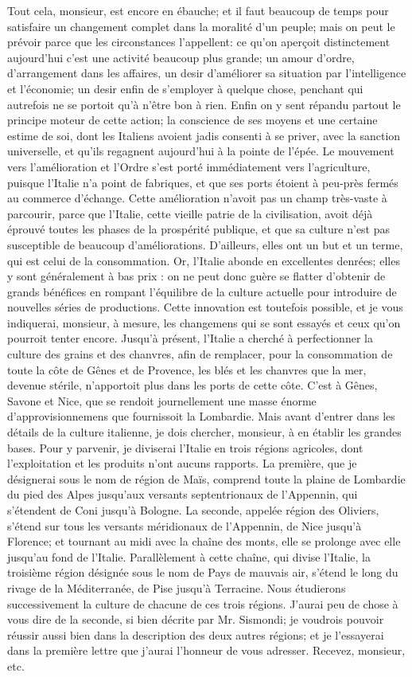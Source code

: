 Tout\setcounter{page}{369} cela, monsieur, est encore en ébauche; et il faut beaucoup de temps pour satisfaire un changement complet dans la moralité d'un peuple; mais on peut le prévoir parce que les circonstances l'appellent: ce qu'on aperçoit distinctement aujourd'hui c'est une activité beaucoup plus grande; un amour d'ordre, d'arrangement dans les affaires, un desir d'améliorer sa situation par l'intelligence et l'économie; un desir enfin de s'employer à quelque chose, penchant qui autrefois ne se portoit qu'à n'être bon à rien. Enfin on y sent répandu partout le principe moteur de cette action; la conscience de ses moyens et une certaine estime de soi, dont les Italiens avoient jadis consenti à se priver, avec la sanction universelle, et qu'ils regagnent aujourd'hui à la pointe de l'épée.
Le mouvement vers l'amélioration et l'Ordre s'est porté immédiatement vers l'agriculture, puisque l'Italie n'a point de fabriques, et que ses ports étoient à peu-près fermés au commerce d'échange. Cette amélioration n'avoit pas un champ très-vaste à parcourir, parce que l'Italie, cette vieille patrie de la civilisation, avoit déjà éprouvé toutes les phases de la prospérité publique, et que sa culture n'est pas susceptible de beaucoup\setcounter{page}{370} d’améliorations. D’ailleurs, elles ont un but et un terme, qui est celui de la consommation. Or, l’Italie abonde en excellentes denrées; elles y sont généralement à bas prix : on ne peut donc guère se flatter d’obtenir de grands bénéfices en rompant l’équilibre de la culture actuelle pour introduire de nouvelles séries de productions. Cette innovation est toutefois possible, et je vous indiquerai, monsieur, à mesure, les changemens qui se sont essayés et ceux qu’on pourroit tenter encore.
Jusqu’à présent, l’Italie a cherché à perfectionner la culture des grains et des chanvres, afin de remplacer, pour la consommation de toute la côte de Gênes et de Provence, les blés et les chanvres que la mer, devenue stérile, n’apportoit plus dans les ports de cette côte. C’est à Gênes, Savone et Nice, que se rendoit journellement une masse énorme d’approvisionnemens que fournissoit la Lombardie.
Mais avant d’entrer dans les détails de la culture italienne, je dois chercher, monsieur, à en établir les grandes bases. Pour y parvenir, je diviserai l’Italie en trois régions agricoles, dont l’exploitation et les produits n’ont aucuns rapports. La première, que je désignerai sous le nom de région de Maïs, comprend toute la plaine de Lombardie du pied des Alpes jusqu’aux versants septentrionaux de l’Appennin, qui s’étendent de Coni jusqu’à Bologne. La seconde, appelée\setcounter{page}{371} région des Oliviers, s'étend sur tous les versants méridionaux de l'Appennin, de Nice jusqu'à Florence; et tournant au midi avec la chaîne des monts, elle se prolonge avec elle jusqu'au fond de l'Italie. Parallèlement à cette chaîne, qui divise l'Italie, la troisième région désignée sous le nom de Pays de mauvais air, s'étend le long du rivage de la Méditerranée, de Pise jusqu'à Terracine.
Nous étudierons successivement la culture de chacune de ces trois régions. J'aurai peu de chose à vous dire de la seconde, si bien décrite par Mr. Sismondi; je voudrois pouvoir réussir aussi bien dans la description des deux autres régions; et je l'essayerai dans la première lettre que j'aurai l'honneur de vous adresser. Recevez, monsieur, etc.
